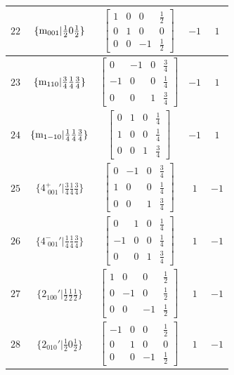 \documentclass[fleqn,8pt]{jsarticle}
\begin{document}
\begin{longtable}{ccccc}
$ 22 $ & $ \{{\rm m}_{001}|\frac{1}{2} 0 \frac{1}{2}\} $ & $ \begin{bmatrix} 1 & 0 & 0 & \frac{1}{2} \\ 0 & 1 & 0 & 0 \\ 0 & 0 & -1 & \frac{1}{2} \end{bmatrix} $ & $ -1 $ & $ 1 $ \\ \hline
$ 23 $ & $ \{{\rm m}_{110}|\frac{3}{4} \frac{1}{4} \frac{3}{4}\} $ & $ \begin{bmatrix} 0 & -1 & 0 & \frac{3}{4} \\ -1 & 0 & 0 & \frac{1}{4} \\ 0 & 0 & 1 & \frac{3}{4} \end{bmatrix} $ & $ -1 $ & $ 1 $ \\ \hline
$ 24 $ & $ \{{\rm m}_{1-10}|\frac{1}{4} \frac{1}{4} \frac{3}{4}\} $ & $ \begin{bmatrix} 0 & 1 & 0 & \frac{1}{4} \\ 1 & 0 & 0 & \frac{1}{4} \\ 0 & 0 & 1 & \frac{3}{4} \end{bmatrix} $ & $ -1 $ & $ 1 $ \\ \hline
$ 25 $ & $ \{4^{+}_{\,\,001}{}'|\frac{3}{4} \frac{1}{4} \frac{3}{4}\} $ & $ \begin{bmatrix} 0 & -1 & 0 & \frac{3}{4} \\ 1 & 0 & 0 & \frac{1}{4} \\ 0 & 0 & 1 & \frac{3}{4} \end{bmatrix} $ & $ 1 $ & $ -1 $ \\ \hline
$ 26 $ & $ \{4^{-}_{\,\,001}{}'|\frac{1}{4} \frac{1}{4} \frac{3}{4}\} $ & $ \begin{bmatrix} 0 & 1 & 0 & \frac{1}{4} \\ -1 & 0 & 0 & \frac{1}{4} \\ 0 & 0 & 1 & \frac{3}{4} \end{bmatrix} $ & $ 1 $ & $ -1 $ \\ \hline
$ 27 $ & $ \{2{}_{100}{}'|\frac{1}{2} \frac{1}{2} \frac{1}{2}\} $ & $ \begin{bmatrix} 1 & 0 & 0 & \frac{1}{2} \\ 0 & -1 & 0 & \frac{1}{2} \\ 0 & 0 & -1 & \frac{1}{2} \end{bmatrix} $ & $ 1 $ & $ -1 $ \\ \hline
$ 28 $ & $ \{2{}_{010}{}'|\frac{1}{2} 0 \frac{1}{2}\} $ & $ \begin{bmatrix} -1 & 0 & 0 & \frac{1}{2} \\ 0 & 1 & 0 & 0 \\ 0 & 0 & -1 & \frac{1}{2} \end{bmatrix} $ & $ 1 $ & $ -1 $ \\ \hline

\end{longtable}
\end{document}
